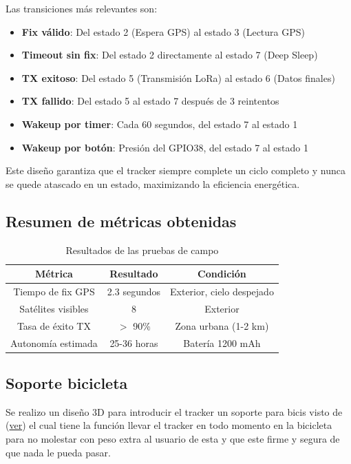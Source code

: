 \documentclass[conference]{IEEEtran}
\begin{document}
Las transiciones más relevantes son:
\begin{itemize}
    \item \textbf{Fix válido}: Del estado 2 (Espera GPS) al estado 3 (Lectura GPS)
    \item \textbf{Timeout sin fix}: Del estado 2 directamente al estado 7 (Deep Sleep)
    \item \textbf{TX exitoso}: Del estado 5 (Transmisión LoRa) al estado 6 (Datos finales)
    \item \textbf{TX fallido}: Del estado 5 al estado 7 después de 3 reintentos
    \item \textbf{Wakeup por timer}: Cada 60 segundos, del estado 7 al estado 1
    \item \textbf{Wakeup por botón}: Presión del GPIO38, del estado 7 al estado 1
\end{itemize}

Este diseño garantiza que el tracker siempre complete un ciclo completo y nunca se quede atascado en un estado, maximizando la eficiencia energética.

\subsection{Resumen de métricas obtenidas}

\begin{table}[H]
    \centering
    \scriptsize
    \caption{Resultados de las pruebas de campo}
    \begin{tabular}{|c|c|c|}
        \hline
        \textbf{Métrica} & \textbf{Resultado} & \textbf{Condición} \\
        \hline
        Tiempo de fix GPS & 2.3 segundos & Exterior, cielo despejado \\
        Satélites visibles & 8 & Exterior \\
        Tasa de éxito TX & $>$ 90\% & Zona urbana (1-2 km) \\
        Autonomía estimada & 25-36 horas & Batería 1200 mAh \\
        \hline
    \end{tabular}
    \label{tab:resultados}
\end{table}

\subsection{Soporte bicicleta}

Se realizo un diseño 3D para introducir el tracker un soporte para bicis visto de (\hyperlink{apendice:soporte}{ver}) el cual tiene la función llevar el tracker en todo momento en la bicicleta para no molestar con peso extra al usuario de esta y que este firme y segura de que nada le pueda pasar.
\end{document}
